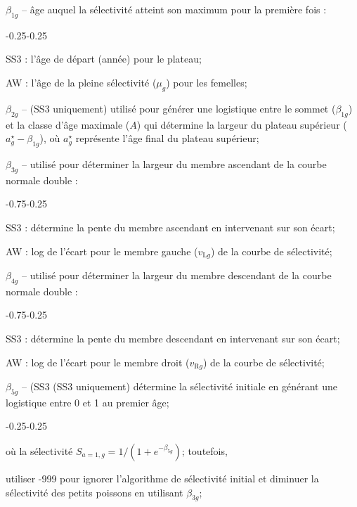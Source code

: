 \documentclass[11pt]{book}
\newcommand{\mr}[1]{\text{#1}}                %
\begin{document}
\begin{enumerate_itemize}{}{}
  \item $\beta_{1g}$ -- \^{a}ge auquel la s\'{e}lectivit\'{e} atteint son maximum pour la premi\`{e}re fois :
    \begin{enumerate_itemize}{-0.25}{-0.25}
      \item SS3 : l'\^{a}ge de d\'{e}part (ann\'{e}e) pour le plateau;
      \item AW : l'\^{a}ge de la pleine s\'{e}lectivit\'{e} ($\mu_g$) pour les femelles;
    \end{enumerate_itemize}
  \item $\beta_{2g}$ -- (SS3 uniquement) utilis\'{e} pour g\'{e}n\'{e}rer une logistique entre le sommet ($\beta_{1g}$) et la classe d'\^{a}ge maximale ($A$) qui d\'{e}termine la largeur du plateau sup\'{e}rieur ($a_g^{\star} - \beta_{1g}$), o\`{u} $a_g^{\star}$ repr\'{e}sente l'\^{a}ge final du plateau sup\'{e}rieur;
  \item $\beta_{3g}$ -- utilis\'{e} pour d\'{e}terminer la largeur du membre ascendant de la courbe normale double :
    \begin{enumerate_itemize}{-0.75}{-0.25}
      \item SS3 : d\'{e}termine la pente du membre ascendant en intervenant sur son \'{e}cart;
      \item AW : log de l'\'{e}cart pour le membre gauche ($v_{\mr{L}g}$) de la courbe de s\'{e}lectivit\'{e};
    \end{enumerate_itemize}
  \item $\beta_{4g}$ -- utilis\'{e} pour d\'{e}terminer la largeur du membre descendant de la courbe normale double :
    \begin{enumerate_itemize}{-0.75}{-0.25}
      \item SS3 : d\'{e}termine la pente du membre descendant en intervenant sur son \'{e}cart;
      \item AW : log de l'\'{e}cart pour le membre droit ($v_{\mr{R}g}$) de la courbe de s\'{e}lectivit\'{e};
    \end{enumerate_itemize}
  \item $\beta_{5g}$ -- (SS3 (SS3 uniquement) d\'{e}termine la s\'{e}lectivit\'{e} initiale en g\'{e}n\'{e}rant une logistique entre 0 et 1 au premier \^{a}ge;
    \begin{enumerate_itemize}{-0.25}{-0.25}
      \item o\`{u} la s\'{e}lectivit\'{e} $S_{a{=}1,g} = 1/(1+e^{-\beta_{5g}})$; toutefois,
      \item utiliser -999 pour ignorer l'algorithme de s\'{e}lectivit\'{e} initial et diminuer la s\'{e}lectivit\'{e} des petits poissons en utilisant $\beta_{3g}$;

\end{enumerate_itemize}
\end{enumerate_itemize}
\end{document}
